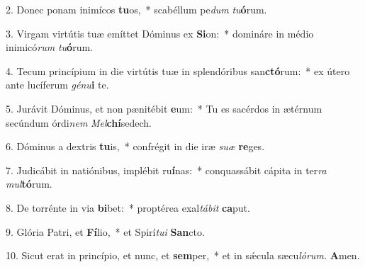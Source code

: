 \item 2. Donec ponam inimícos \textbf{tu}os,~* scabéllum pe\hspace{0.03em}\textit{dum} \textit{tu}\textbf{ó}rum.
\item 3. Virgam virtútis tuæ emíttet Dóminus ex \textbf{Si}on:~* domináre in médio inimicó\textit{rum} \textit{tu}\textbf{ó}rum.
\item 4. Tecum princípium in die virtútis tuæ in splendóribus san\textbf{ctó}rum:~* ex útero ante lucíferum \textit{génu}\textbf{i} te.
\item 5. Jurávit Dóminus, et non pænitébit \textbf{e}um:~* Tu es sacérdos in ætérnum secúndum órdi\textit{nem} \textit{Mel}\textbf{chí}sedech.
\item 6. Dóminus a dextris \textbf{tu}is,~* confrégit in die iræ \textit{suæ} \textbf{re}ges.
\item 7. Judicábit in natiónibus, implébit ru\textbf{í}nas:~* conquassábit cápita in ter\textit{ra} \textit{mul}\textbf{tó}rum.
\item 8. De torrénte in via \textbf{bi}bet:~* proptérea exal\textit{tábit} \textbf{ca}put.
\item 9. Glória Patri, et \textbf{Fí}lio,~* et Spirí\hspace{0.03em}\textit{tui} \textbf{San}cto.
\item 10. Sicut erat in princípio, et nunc, et \textbf{sem}per,~* et in sǽcula sæcu\hspace{0.03em}\textit{lórum.} \textbf{A}men.
